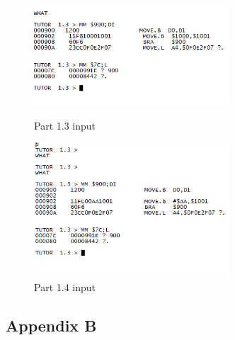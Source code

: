 \documentclass{article}
\begin{document}
					
					\begin{figure}[!htb]
					\begin{center}
					\includegraphics[width=0.65\textwidth]{b} 
					\caption{Part 1.3  input}
					\includegraphics[width=0.65\textwidth]{c} 
					\caption{Part 1.4  input}
					\end{center}\end{figure}
					
\FloatBarrier
			


\subsection{Appendix B}
\end{document}
